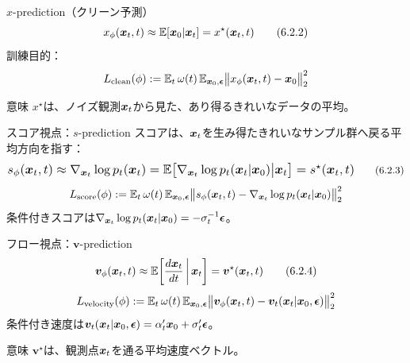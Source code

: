 \asmain
\begin{frame}{$x$-prediction（クリーン予測）}
    \[
        x_\phi(\bm{x}_t,t)
        \approx
        \mathbb{E}[\bm{x}_0|\bm{x}_t]
        =
        x^\star(\bm{x}_t,t)
        \tag{6.2.2}
    \]
    訓練目的：
    \[
        L_{\mathrm{clean}}(\phi)
        :=
        \mathbb{E}_{t}\,
        \omega(t)\,
        \mathbb{E}_{\bm{x}_0,\bm{\epsilon}}
        \bigl\|
        x_\phi(\bm{x}_t,t)-\bm{x}_0
        \bigr\|_{2}^{2}
    \]
    \begin{exampleblock}{意味}
        $x^\star$は、ノイズ観測$\bm{x}_t$から見た、あり得るきれいなデータの平均。
    \end{exampleblock}
\end{frame}
\asmain
\begin{frame}{スコア視点：$s$-prediction}
    スコアは、$\bm{x}_t$を生み得たきれいなサンプル群へ戻る平均方向を指す：
    \[
        \resizebox{0.98\textwidth}{!}{$
        s_\phi(\vx_t,t)
        \approx
        \nabla_{\vx_t}\log p_t(\vx_t)
        =
        \mathbb{E}\bigl[\nabla_{\vx_t}\log p_t(\vx_t|\vx_0)\big|\vx_t\bigr]
        =
        s^\star(\vx_t,t)
        $}
        \tag{6.2.3}
    \]
    \[
        L_{\mathrm{score}}(\phi)
        :=
        \mathbb{E}_{t}\,
        \omega(t)\,
        \mathbb{E}_{\bm{x}_0,\bm{\epsilon}}
        \bigl\|
        s_\phi(\bm{x}_t,t)
        -
        \nabla_{\bm{x}_t}\log p_t(\bm{x}_t|\bm{x}_0)
        \bigr\|_{2}^{2}
    \]
    条件付きスコアは$\nabla_{\bm{x}_t}\log p_t(\bm{x}_t|\bm{x}_0)=-\sigma_t^{-1}\bm{\epsilon}$。
\end{frame}
\asmain
\begin{frame}{フロー視点：$\bm{v}$-prediction}
    \[
        \bm{v}_\phi(\bm{x}_t,t)
        \approx
        \mathbb{E}\!\left[\frac{d\bm{x}_t}{dt}\,\bigg|\,\bm{x}_t\right]
        =
        \bm{v}^\star(\bm{x}_t,t)
        \tag{6.2.4}
    \]
    \[
        L_{\mathrm{velocity}}(\phi)
        :=
        \mathbb{E}_{t}\,
        \omega(t)\,
        \mathbb{E}_{\bm{x}_0,\bm{\epsilon}}
        \bigl\|
        \bm{v}_\phi(\bm{x}_t,t)
        -
        \bm{v}_t(\bm{x}_t|\bm{x}_0,\bm{\epsilon})
        \bigr\|_{2}^{2}
    \]
    条件付き速度は$\bm{v}_t(\bm{x}_t|\bm{x}_0,\bm{\epsilon})=\alpha_t'\bm{x}_0+\sigma_t'\bm{\epsilon}$。
    \begin{exampleblock}{意味}
        $\bm{v}^\star$は、観測点$\bm{x}_t$を通る平均速度ベクトル。
    \end{exampleblock}
\end{frame}
